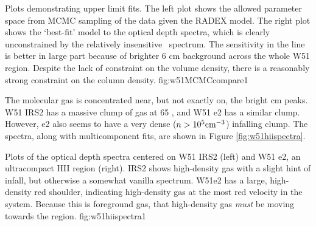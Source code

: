 {Plots demonstrating upper limit fits.  The left plot shows the allowed
parameter space from MCMC sampling of the data given the RADEX model.  The
right plot shows the `best-fit' model to the optical depth spectra, which is
clearly unconstrained by the relatively insensitive \twotwo\ spectrum.  The
sensitivity in the \oneone line is better in large part because of brighter 6
cm background across the whole W51 region.  Despite the lack of constraint on the
volume density, there is a reasonably strong constraint on the column density.}
{fig:w51MCMCcompare}{1}

The molecular gas is concentrated near, but not exactly on, the bright cm
peaks.  W51 IRS2 has a massive clump of gas at 65 \kms, and W51 e2 has a
similar clump.  However, e2 also seems to have a very dense ($n>10^5 \textrm{cm}^{-3}$)
infalling clump.  The spectra, along with multicomponent fits, are shown in
Figure \ref{fig:w51hiispectra}.

{Plots of the optical depth spectra centered on W51 IRS2 (left) and W51 e2, an
ultracompact HII region (right).  IRS2 shows high-density gas with a slight
hint of infall, but otherwise a somewhat vanilla spectrum.  W51e2 has a large,
high-density red shoulder, indicating high-density gas at the most red velocity
in the system.  Because this is foreground gas, that high-density gas
\emph{must} be moving towards the \uchii region.}
{fig:w51hiispectra}{1}

%

